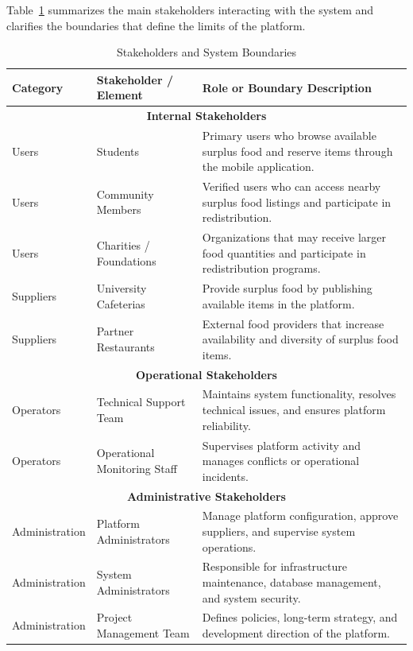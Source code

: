 \documentclass[conference]{IEEEtran}
\begin{document}
Table~\ref{tab:stakeholdersboundaries} summarizes the main stakeholders interacting with the system and clarifies the boundaries that define the limits of the platform.

\begin{table}[h]
\centering
\caption{Stakeholders and System Boundaries}
\label{tab:stakeholdersboundaries}
\begin{tabular}{|p{3cm}|p{4cm}|p{8cm}|}
\hline
\textbf{Category} & \textbf{Stakeholder / Element} & \textbf{Role or Boundary Description} \\
\hline
\multicolumn{3}{|c|}{\textbf{Internal Stakeholders}} \\
\hline
Users & Students & Primary users who browse available surplus food and reserve items through the mobile application. \\
\hline
Users & Community Members & Verified users who can access nearby surplus food listings and participate in redistribution. \\
\hline
Users & Charities / Foundations & Organizations that may receive larger food quantities and participate in redistribution programs. \\
\hline
Suppliers & University Cafeterias & Provide surplus food by publishing available items in the platform. \\
\hline
Suppliers & Partner Restaurants & External food providers that increase availability and diversity of surplus food items. \\
\hline
\multicolumn{3}{|c|}{\textbf{Operational Stakeholders}} \\
\hline
Operators & Technical Support Team & Maintains system functionality, resolves technical issues, and ensures platform reliability. \\
\hline
Operators & Operational Monitoring Staff & Supervises platform activity and manages conflicts or operational incidents. \\
\hline
\multicolumn{3}{|c|}{\textbf{Administrative Stakeholders}} \\
\hline
Administration & Platform Administrators & Manage platform configuration, approve suppliers, and supervise system operations. \\
\hline
Administration & System Administrators & Responsible for infrastructure maintenance, database management, and system security. \\
\hline
Administration & Project Management Team & Defines policies, long-term strategy, and development direction of the platform. \\

\end{tabular}
\end{table}
\end{document}
